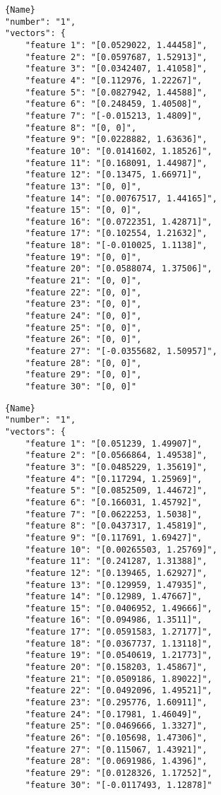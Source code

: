 \noindent\begin{minipage}{.45\textwidth}
\begin{lstlisting}[caption={\code{calcOpticalFlowPyrLK} values},frame=tlrb,basicstyle=\tiny]{Name}
"number": "1",
"vectors": {
	"feature 1": "[0.0529022, 1.44458]",
	"feature 2": "[0.0597687, 1.52913]",
	"feature 3": "[0.0342407, 1.41058]",
	"feature 4": "[0.112976, 1.22267]",
	"feature 5": "[0.0827942, 1.44588]",
	"feature 6": "[0.248459, 1.40508]",
	"feature 7": "[-0.015213, 1.4809]",
	"feature 8": "[0, 0]",
	"feature 9": "[0.0228882, 1.63636]",
	"feature 10": "[0.0141602, 1.18526]",
	"feature 11": "[0.168091, 1.44987]",
	"feature 12": "[0.13475, 1.66971]",
	"feature 13": "[0, 0]",
	"feature 14": "[0.00767517, 1.44165]",
	"feature 15": "[0, 0]",
	"feature 16": "[0.0722351, 1.42871]",
	"feature 17": "[0.102554, 1.21632]",
	"feature 18": "[-0.010025, 1.1138]",
	"feature 19": "[0, 0]",
	"feature 20": "[0.0588074, 1.37506]",
	"feature 21": "[0, 0]",
	"feature 22": "[0, 0]",
	"feature 23": "[0, 0]",
	"feature 24": "[0, 0]",
	"feature 25": "[0, 0]",
	"feature 26": "[0, 0]",
	"feature 27": "[-0.0355682, 1.50957]",
	"feature 28": "[0, 0]",
	"feature 29": "[0, 0]",
	"feature 30": "[0, 0]"
\end{lstlisting}
\end{minipage}\hfill
\begin{minipage}{.45\textwidth}
\begin{lstlisting}[caption={\code{compute\_lk\_gpu} values},frame=tlrb,basicstyle=\tiny]{Name}
"number": "1",
"vectors": {
	"feature 1": "[0.051239, 1.49907]",
	"feature 2": "[0.0566864, 1.49538]",
	"feature 3": "[0.0485229, 1.35619]",
	"feature 4": "[0.117294, 1.25969]",
	"feature 5": "[0.0852509, 1.44672]",
	"feature 6": "[0.166031, 1.45792]",
	"feature 7": "[0.0622253, 1.5038]",
	"feature 8": "[0.0437317, 1.45819]",
	"feature 9": "[0.117691, 1.69427]",
	"feature 10": "[0.00265503, 1.25769]",
	"feature 11": "[0.241287, 1.31388]",
	"feature 12": "[0.139465, 1.62927]",
	"feature 13": "[0.129959, 1.47935]",
	"feature 14": "[0.12989, 1.47667]",
	"feature 15": "[0.0406952, 1.49666]",
	"feature 16": "[0.094986, 1.3511]",
	"feature 17": "[0.0591583, 1.27177]",
	"feature 18": "[0.0367737, 1.13118]",
	"feature 19": "[0.0540619, 1.21773]",
	"feature 20": "[0.158203, 1.45867]",
	"feature 21": "[0.0509186, 1.89022]",
	"feature 22": "[0.0492096, 1.49521]",
	"feature 23": "[0.295776, 1.60911]",
	"feature 24": "[0.17981, 1.46049]",
	"feature 25": "[0.0469666, 1.3327]",
	"feature 26": "[0.105698, 1.47306]",
	"feature 27": "[0.115067, 1.43921]",
	"feature 28": "[0.0691986, 1.4396]",
	"feature 29": "[0.0128326, 1.17252]",
	"feature 30": "[-0.0117493, 1.12878]"
\end{lstlisting}
\end{minipage}



